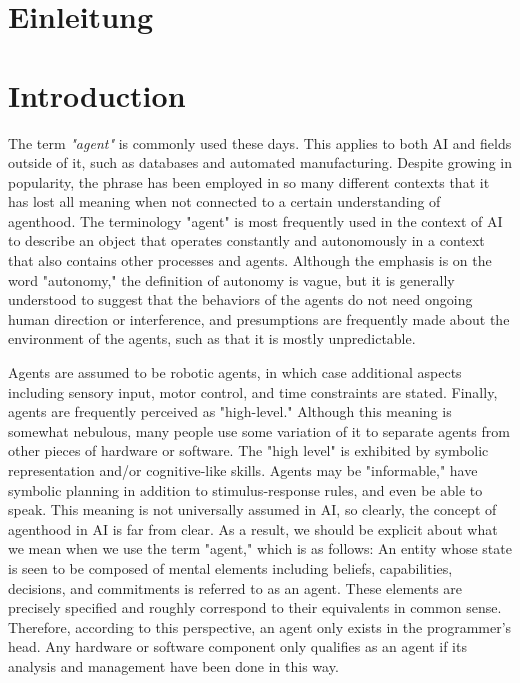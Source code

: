 {\chapter{Einleitung}}
{\chapter{Introduction}}

\label{sec:introduction}


The term \textit{"agent"} is commonly used these days. This applies to both \ac{AI} and fields outside of it, such as databases and automated manufacturing. Despite growing in popularity, the phrase has been employed in so many different contexts that it has lost all meaning when not connected to a certain understanding of agenthood. The terminology "agent" is most frequently used in the context of  \ac{AI} to describe an object that operates constantly and autonomously in a context that also contains other processes and agents. Although the emphasis is on the word "autonomy,"  the definition of autonomy is vague, but it is generally understood to suggest that the behaviors of the agents do not need ongoing human direction or interference, and presumptions are frequently made about the environment of the agents, such as that it is mostly unpredictable.

\vspace{.5cm}

Agents are assumed to be robotic agents, in which case additional aspects including sensory input, motor control, and time constraints are stated. Finally, agents are frequently perceived as "high-level." Although this meaning is somewhat nebulous, many people use some variation of it to separate agents from other pieces of hardware or software. The "high level" is exhibited by symbolic representation and/or cognitive-like skills. Agents may be "informable," have symbolic planning in addition to stimulus-response rules, and even be able to speak. This meaning is not universally assumed in \ac{AI}, so clearly, the concept of agenthood in \ac{AI} is far from clear. As a result, we should be explicit about what we mean when we use the term "agent," which is as follows: An entity whose state is seen to be composed of mental elements including beliefs, capabilities, decisions, and commitments is referred to as an agent. These elements are precisely specified and roughly correspond to their equivalents in common sense. Therefore, according to this perspective, an agent only exists in the programmer's head. Any hardware or software component only qualifies as an agent if its analysis and management have been done in this way.

